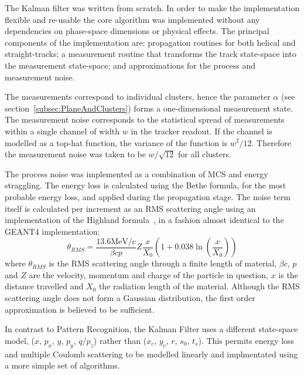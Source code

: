     The Kalman filter was written from scratch. In order to make the implementation flexible and re-usable the core algorithm was implemented without any dependencies on phase-space dimensions or physical effects. %
    The principal components of the implementation are: propagation routines for both helical and straight-tracks; a measurement routine that transforms the track state-space into the measurement state-space; and approximations for the process and measurement noise.
    
    The measurements correspond to individual clusters, hence the parameter $\alpha$ (see section~\ref{subsec:PlaneAndClusters}) forms a one-dimensional measurement state. The measurement noise corresponds to the statistical spread of measurements within a single channel of width $w$ in the tracker readout. If the channel is modelled as a top-hat function, the variance of the function is $w^2/12$. Therefore the measurement noise was taken to be $w/\sqrt{12}$ for all clusters.

    The process noise was implemented as a combination of MCS and energy straggling. The energy loss is calculated using the Bethe formula, for the most probable energy loss, and applied during the propagation stage. The noise term itself is calculated per increment as an RMS scattering angle using an implementation of the Highland formula~\cite{PDG}, in a fashion almost identical to the GEANT4 implementation:
    \begin{equation}
      \theta_{RMS} = \frac{13.6\textrm{MeV/c}}{\beta c p} Z \frac{x}{X_0}\left( 1 + 0.038 \ln\left(\frac{x}{X_0} \right)\right)
      \label{equ:highland_formula}
    \end{equation}
    where $\theta_{RMS}$ is the RMS scattering angle through a finite length of material, $\beta c$, $p$ and $Z$ are the velocity, momentum and charge of the particle in question, $x$ is the distance travelled and $X_0$ the radiation length of the material. Although the RMS scattering angle does not form a Gaussian distribution, the first order approximation is believed to be sufficient.

    In contrast to Pattern Recognition, the Kalman Filter uses a different state-space model, ($x$, $p_x$, $y$, $p_y$, $q/p_z$) rather than ($x_c$, $y_c$, $r$, $s_0$, $t_s$). This permits energy loss and multiple Coulomb scattering to be modelled linearly and implmentated using a more simple set of algorithms. 
    
